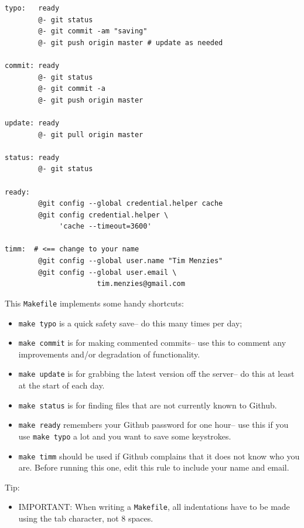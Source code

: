 \begin{lstlisting}
typo:   ready
        @- git status
        @- git commit -am "saving"
        @- git push origin master # update as needed

commit: ready
        @- git status
        @- git commit -a
        @- git push origin master

update: ready
        @- git pull origin master

status: ready
        @- git status

ready:
        @git config --global credential.helper cache
        @git config credential.helper \
             'cache --timeout=3600'

timm:  # <== change to your name
        @git config --global user.name "Tim Menzies"
        @git config --global user.email \
                      tim.menzies@gmail.com
\end{lstlisting}

This \texttt{Makefile} implements some handy shortcuts:

\begin{itemize}
\itemsep1pt\parskip0pt
\item
  \texttt{make\ typo} is a quick safety save-- do this many times per
  day;
\item
  \texttt{make\ commit} is for making commented commits-- use this to
  comment any improvements and/or degradation of functionality.
\item
  \texttt{make\ update} is for grabbing the latest version off the
  server-- do this at least at the start of each day.
\item
  \texttt{make\ status} is for finding files that are not currently
  known to Github.
\item
  \texttt{make\ ready} remembers your Github password for one hour-- use
  this if you use \texttt{make\ typo} a lot and you want to save some
  keystrokes.
\item
  \texttt{make\ timm} should be used if Github complains that it does
  not know who you are. Before running this one, edit this rule to
  include your name and email.
\end{itemize}

Tip:

\begin{itemize}
\itemsep1pt\parskip0pt
\item
  IMPORTANT: When writing a \texttt{Makefile}, all indentations have to
  be made using the tab character, not 8 spaces.
\end{itemize}

